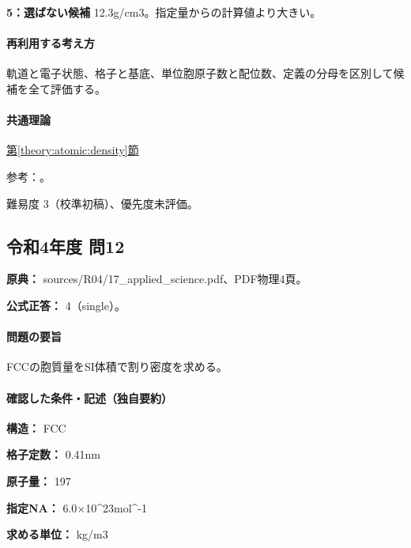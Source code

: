 \noindent\textbf{5：選ばない候補} 12.3g/cm3。指定量からの計算値より大きい。\par

\paragraph{再利用する考え方} 軌道と電子状態、格子と基底、単位胞原子数と配位数、定義の分母を区別して候補を全て評価する。

\paragraph{共通理論} \hyperref[theory:atomic:density]{第\ref*{theory:atomic:density}節}

\par 参考：\cite{openstax_crystals}。

\par 難易度 3（校準初稿）、優先度未評価。

\subsection{令和4年度 問12}
\label{q:r04-reg-applied-12}

\noindent\textbf{原典：} sources/R04/17\_applied\_science.pdf、PDF物理4頁。

\textbf{公式正答：} 4（single）。

\paragraph{問題の要旨} FCCの胞質量をSI体積で割り密度を求める。

\paragraph{確認した条件・記述（独自要約）}\mbox{}\par

\noindent\textbf{構造：} FCC\par

\noindent\textbf{格子定数：} 0.41nm\par

\noindent\textbf{原子量：} 197\par

\noindent\textbf{指定NA：} 6.0×10\textasciicircum{}23mol\textasciicircum{}-1\par

\noindent\textbf{求める単位：} kg/m3\par

